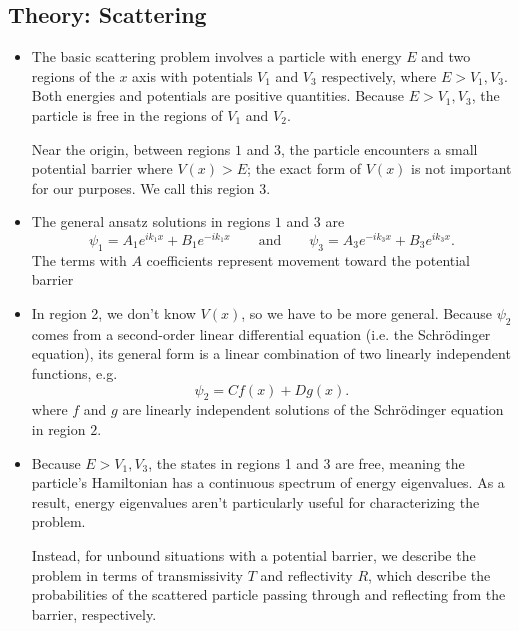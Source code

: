 \documentclass[11pt, a4paper]{article}
\newcommand{\eqtext}[1]{\qquad \text{#1} \qquad}
\newcommand{\Schro}{Schr\"{o}dinger\xspace}
\begin{document}
\subsection{Theory: Scattering}
\begin{itemize}
	\item The basic scattering problem involves a particle with energy $ E $ and two regions of the $ x $ axis with potentials $ V_{1} $ and $ V_{3} $ respectively,  where $ E > V_{1}, V_{3} $. Both energies and potentials are positive quantities. Because $ E > V_{1}, V_{3} $, the particle is free in the regions of $ V_{1} $ and $ V_{2} $.
	
	Near the origin, between regions $ 1 $ and $ 3 $, the particle encounters a small potential barrier where $ V(x) > E $; the exact form of $ V(x) $ is not important for our purposes. We call this region $ 3 $. 
	
	\item The general ansatz solutions in regions $ 1 $ and $ 3 $ are
	\begin{equation*}
		\psi_{1} = A_{1} e^{ik_{1}x} + B_{1}e^{-ik_{1}x} \eqtext{and} \psi_{3} = A_{3} e^{-ik_{3}x} + B_{3}e^{ik_{3}x}.
	\end{equation*}
	The terms with $ A $ coefficients represent movement toward the potential barrier 
	
	\item In region 2, we don't know $ V(x) $, so we have to be more general. Because $ \psi_{2} $ comes from a second-order linear differential equation (i.e. the \Schro equation), its general form is a linear combination of two linearly independent functions, e.g.
	\begin{equation*}
		\psi_{2} = C f(x) + D g(x).
	\end{equation*}
	where $ f $ and $ g $ are linearly independent solutions of the \Schro equation in region $ 2 $. 
	
	\item Because $ E > V_{1}, V_{3} $, the states in regions 1 and 3 are free, meaning the particle's Hamiltonian has a continuous spectrum of energy eigenvalues. As a result, energy eigenvalues aren't particularly useful for characterizing the problem. 
	
	Instead, for unbound situations with a potential barrier, we describe the problem in terms of transmissivity $ T $ and reflectivity $ R $, which describe the probabilities of the scattered particle passing through and reflecting from the barrier, respectively.
\end{itemize}
\end{document}
